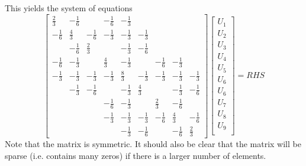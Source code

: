 This yields the system of equations 
\begin{equation*}
  \begin{bmatrix}
    \frac{2}{3} &-\frac{1}{6} &\frac{}{} &-\frac{1}{6} &-\frac{1}{3} 
          &\frac{}{} &\frac{}{} &\frac{}{} &\frac{}{} \\
    -\frac{1}{6} &\frac{4}{3} &-\frac{1}{6} &-\frac{1}{3} &-\frac{1}{3} 
          &-\frac{1}{3} &\frac{}{} &\frac{}{} &\frac{}{} \\
    \frac{}{} &-\frac{1}{6} &\frac{2}{3} &\frac{}{} &-\frac{1}{3} 
          &-\frac{1}{6} &\frac{}{} &\frac{}{} &\frac{}{} \\
    -\frac{1}{6} &-\frac{1}{3} &\frac{}{} &\frac{4}{3} &-\frac{1}{3} 
          &\frac{}{} &-\frac{1}{6} &-\frac{1}{3} &\frac{}{} \\
    -\frac{1}{3} &-\frac{1}{3} &-\frac{1}{3} &-\frac{1}{3} &\frac{8}{3} 
          &-\frac{1}{3} &-\frac{1}{3} &-\frac{1}{3} &-\frac{1}{3} \\
    \frac{}{} &-\frac{1}{3} &-\frac{1}{6} &\frac{}{} &-\frac{1}{3} 
          &\frac{4}{3} &\frac{}{} &-\frac{1}{3} &-\frac{1}{6} \\
    \frac{}{} &\frac{}{} &\frac{}{} &-\frac{1}{6} &-\frac{1}{3} 
          &\frac{}{} &\frac{2}{3} &-\frac{1}{6} &\frac{}{} \\
    \frac{}{} &\frac{}{} &\frac{}{} &-\frac{1}{3} &-\frac{1}{3} 
          &-\frac{1}{3} &-\frac{1}{6} &\frac{4}{3} &-\frac{1}{6} \\
    \frac{}{} &\frac{}{} &\frac{}{} &\frac{}{} &-\frac{1}{3} 
          &-\frac{1}{6} &\frac{}{} &-\frac{1}{6} &\frac{2}{3}
   \end{bmatrix}
   \begin{bmatrix}
     U_{1} \\
     U_{2} \\
     U_{3} \\
     U_{4} \\
     U_{5} \\
     U_{6} \\
     U_{6} \\
     U_{7} \\
     U_{8} \\
     U_{9} \\
   \end{bmatrix}
   = RHS
\end{equation*}
Note that the matrix is symmetric. It should also be clear that the matrix
will be sparse (i.e. contains many zeros) if there is a larger number of elements.

